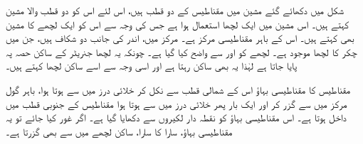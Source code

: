 شکل میں دکھائے گئے مشین میں مقناطیس کے دو قطب ہیں، اس لئے اس کو دو قطب والا مشین کہتے ہیں۔ اس مشین میں ایک لچھا استعمال ہوا ہے جس کی وجہ سے اس کو ایک لچھے کا مشین بھی کہتے ہیں۔ اس کے باہر مقناطیسی مرکز ہے۔ مرکز میں، اندر کی جانب دو  شکاف ہیں، جن میں   چکر کا لچھا موجود ہے۔ لچھے کو  اور  سے واضح کیا گیا ہے۔ چونکہ یہ لچھا جنریٹر کے ساکن حصہ پہ پایا جاتا ہے لہٰذا  یہ بھی ساکن رہتا ہے اور اسی وجہ سے اسے  ساکن لچھا کہتے ہیں۔

 مقناطیس کا مقناطیسی بہاؤ اس کے شمالی قطب   سے نکل کر خلائی درز میں سے ہوتا ہوا، باہر گول مرکز میں سے گزر کر اور ایک بار پھر  خلائی درز میں سے ہوتا ہوا مقناطیس کے جنوبی قطب    میں داخل ہوتا ہے۔ اس مقناطیسی بہاؤ کو نقطہ دار لکیروں سے دکھایا گیا ہے۔  اگر غور کیا جائے تو یہ  مقناطیسی بہاؤ، سارا کا سارا، ساکن لچھے میں سے بھی گزرتا ہے۔

